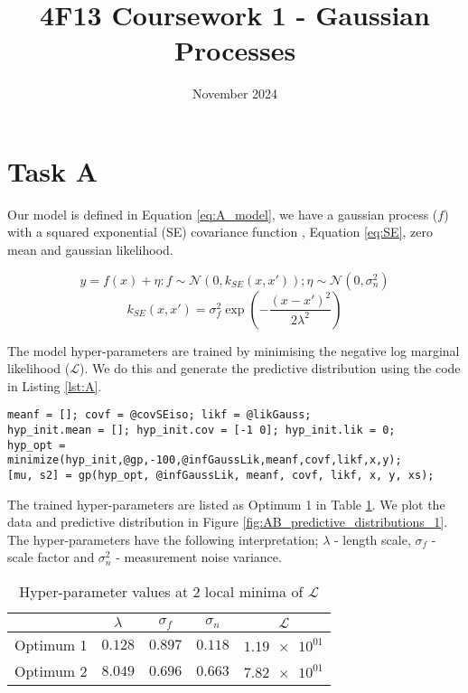 \documentclass[11pt]{article}
\title{\vspace{-2cm}4F13 Coursework 1 - Gaussian Processes}
\author{}
\date{November 2024}
\newcommand{\Lik}{\mathcal{L}}
\begin{document}


\setcounter{page}{1}

\maketitle
\section{Task A}

Our model is defined in Equation \ref{eq:A_model}, we have a gaussian process ($f$) with a squared exponential (SE) covariance function , Equation \ref{eq:SE}, zero mean and gaussian likelihood. 

\begin{equation}
    y = f(x) + \eta : f \sim \mathcal{N}(0, k_{SE}(x, x')); \eta \sim \mathcal{N}(0, \sigma_n^2)
    \label{eq:A_model}
\end{equation}
\begin{equation}
    k_{SE}(x,x') = \sigma_f^2 \exp(-\frac{(x-x')^2}{2\lambda^2})    \label{eq:SE}
\end{equation}

The model hyper-parameters are trained by minimising the negative log marginal likelihood ($\Lik$). We do this and generate the predictive distribution using the code in Listing \ref{lst:A}. 

\begin{lstlisting}[caption=Code to train hyper-parameters and generate the predictive distribution of a GP with squared exponential covariance, label=lst:A, captionpos=b, basicstyle=\small, frame=tlrb]
meanf = []; covf = @covSEiso; likf = @likGauss; 
hyp_init.mean = []; hyp_init.cov = [-1 0]; hyp_init.lik = 0;
hyp_opt = minimize(hyp_init,@gp,-100,@infGaussLik,meanf,covf,likf,x,y);
[mu, s2] = gp(hyp_opt, @infGaussLik, meanf, covf, likf, x, y, xs);
\end{lstlisting}

The trained hyper-parameters are listed as Optimum 1 in Table \ref{table:AB_hyper_parameters}. We plot the data and predictive distribution in Figure \ref{fig:AB_predictive_distributions_1}. The hyper-parameters have the following interpretation; $\lambda$ - length scale, $\sigma_f$ - scale factor and $\sigma_n^2$ - measurement noise variance.

\begin{table}[h]
    \centering
    \small
    \begin{tabular}{|c|c|c|c|c|}
        \hline
         & $\lambda$ & $\sigma_f$ & $\sigma_n$ & $\Lik$ \\
        \hline
        Optimum 1 & $0.128$ & $0.897$ & $0.118$ & $\num{1.19e+01}$ \\ 
        Optimum 2 & $8.049$ & $0.696$ & $0.663$ & $\num{7.82e+01}$ \\ 
        \hline
    \end{tabular}
    \caption{Hyper-parameter values at 2 local minima of $\Lik$}
    \label{table:AB_hyper_parameters}
\end{table}
\end{document}
